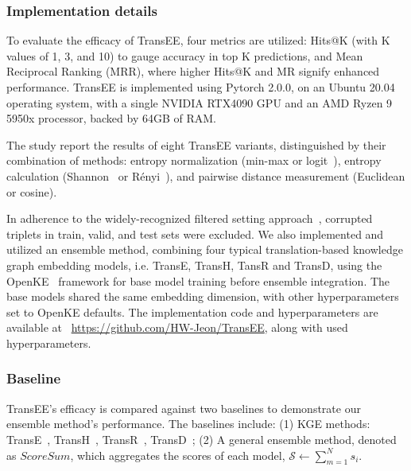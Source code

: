 \documentclass{article}
\begin{document}
\subsubsection{Implementation details}
To evaluate the efficacy of TransEE, four metrics are utilized: Hits@K (with K values of 1, 3, and 10) to gauge accuracy in top K predictions, and Mean Reciprocal Ranking (MRR), where higher Hits@K and MR signify enhanced performance. TransEE is implemented using Pytorch 2.0.0, on an Ubuntu 20.04 operating system, with a single NVIDIA RTX4090 GPU and an AMD Ryzen 9 5950x processor, backed by 64GB of RAM.

The study report the results of eight TransEE variants, distinguished by their combination of methods: entropy normalization (min-max or logit~\cite{berkson1944application}), entropy calculation (Shannon~\cite{shannon1948mathematical} or Rényi~\cite{renyi1961measures}), and pairwise distance measurement (Euclidean or cosine).

In adherence to the widely-recognized filtered setting approach~\cite{bordes2013translating}, corrupted triplets in train, valid, and test sets were excluded. We also implemented and utilized an ensemble method, combining four typical translation-based knowledge graph embedding models, i.e. TransE, TransH, TansR and TransD, using the OpenKE~\cite{han-etal-2018-openke} framework for base model training before ensemble integration. The base models shared the same embedding dimension, with other hyperparameters set to OpenKE defaults. The implementation code and hyperparameters are available at ~\hyperlink{https://github.com/HW-Jeon/TransEE}{https://github.com/HW-Jeon/TransEE}, along with used hyperparameters.

\subsubsection{Baseline}
TransEE's efficacy is compared against two baselines to demonstrate our ensemble method's performance. The baselines include: (1) KGE methods: TransE~\cite{bordes2013translating}, TransH~\cite{wang2014knowledge}, TransR~\cite{lin2015learning}, TransD~\cite{ji2015knowledge};  (2) A general ensemble method, denoted as $ScoreSum$, which aggregates the scores of each model, $\mathcal{S} \leftarrow \sum_{m=1}^{N} s\acute{}_i$.


\end{document}
